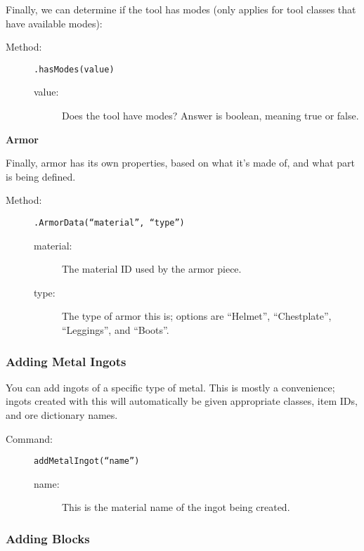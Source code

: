 \documentclass[letterpaper,titlepage,12pt]{article}
\begin{document}
Finally, we can determine if the tool has modes (only applies for tool classes that have available modes):

\begin{description}
\item[Method:] \texttt{.hasModes(value)}
\begin{description}
\item [value:] Does the tool have modes?  Answer is boolean, meaning true or false.
\end{description}
\end{description}

\vspace{2em}
\textbf{Armor}
\vspace{1em}

Finally, armor has its own properties, based on what it's made of, and what part is being defined.

\begin{description}
\item[Method:] \texttt{.ArmorData(``material'', ``type'')}
\begin{description}
\item [material:] The material ID used by the armor piece.
\item [type:] The type of armor this is; options are ``Helmet'', ``Chestplate'', ``Leggings'', and ``Boots''.
\end{description}
\end{description}


\subsubsection{Adding Metal Ingots}

You can add ingots of a specific type of metal.  This is mostly a convenience; ingots created with this will automatically be given appropriate classes, item IDs, and ore dictionary names.

\begin{description}
\item[Command:] \texttt{addMetalIngot(``name'')}
\begin{description}
\item [name:] This is the material name of the ingot being created.
\end{description}
\end{description}

\subsubsection{Adding Blocks}
\end{document}
